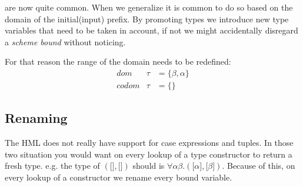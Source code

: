 are now quite common. When we generalize it is common to do so based on the domain of the initial(input) prefix. By promoting types we introduce new type variables that need to be taken in account, if not we might accidentally disregard a \emph{scheme bound} without noticing.

For that reason the range of the domain needs to be redefined:
\begin{eqnarray*}
dom   &\tau& = \{\beta, \alpha\}\\
codom &\tau& = \{\}
\end{eqnarray*}
\subsection{Renaming}

The HML does not really have support for case expressions and tuples. In those two situation you would want on every lookup of a type constructor to return a fresh type. e.g. the type of $(\lbrack \rbrack, \lbrack \rbrack)$ should is $\forall \alpha \beta . (\lbrack \alpha \rbrack, \lbrack \beta \rbrack)$. Because of this, on every lookup of a constructor we rename every bound variable.
